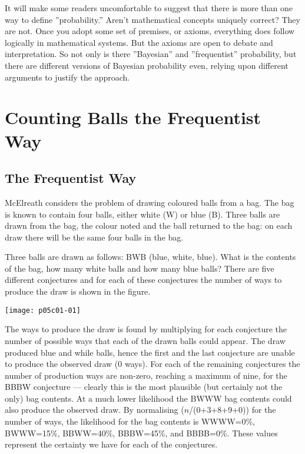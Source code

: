  It will make some readers uncomfortable to suggest that
there is more than one way to define ''probability.'' Aren’t mathematical concepts uniquely correct?
They are not. Once you adopt some set of premises, or axioms, everything does follow logically in
mathematical systems. But the axioms are open to debate and interpretation. So not only is there
''Bayesian'' and ''frequentist'' probability, but there are different versions of Bayesian probability even, relying upon different arguments to justify the approach.\cite{McElreath2015}

\section{Counting Balls the Frequentist Way}
\label{sec:CountingBalls}
\subsection{The Frequentist Way}
\label{sec:TheFrequentistWay}

McElreath \cite{McElreath2015} considers the problem of drawing coloured balls from a bag.  The bag is known to contain four balls, either white (W) or blue (B).  Three balls are drawn from the bag, the colour noted and the ball returned to the bag: on each draw there will be the same four balls in the bag.

Three balls are drawn as follows: BWB (blue, white, blue). What is the contents of the bag, how many white balls and how many blue balls?  There are five different conjectures and for each of these conjectures the number of ways to produce the draw is shown in the figure.
\begin{marginfigure}
\texttt{[image: p05c01-01]}
\end{marginfigure}
The ways to produce the draw is found by multiplying for each conjecture the number of possible ways that each of the drawn balls could appear.  The draw produced blue and while balls, hence the first and the last conjecture are unable to produce the observed draw (0 ways). For each of the remaining conjectures the number of production ways are non-zero, reaching a maximum of nine, for the BBBW conjecture --- clearly this is the most plausible (but certainly not the only) bag contents.  At a much lower likelihood the BWWW bag contents could also produce the observed draw.
By normalising ($n$/(0+3+8+9+0)) for the number of ways, the likelihood for the bag contents is
WWWW=0\%, 
BWWW=15\%,
BBWW=40\%,
BBBW=45\%, and
BBBB=0\%.  These values represent the certainty we have for each of the conjectures.

